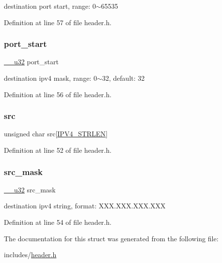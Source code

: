 destination port start, range\+: 0$\sim$65535 

Definition at line 57 of file header.\+h.

\mbox{\label{struct_input_arguments_a5465bae0b80139c3aab02aadda37a2ec}} 
\subsubsection{\texorpdfstring{port\+\_\+start}{port\_start}}
{\footnotesize\ttfamily \hyperlink{asm__types_8h_a3acae9310e2c2e411e800a8a369171c6}{\+\_\+\+\_\+u32} port\+\_\+start}

destination ipv4 mask, range\+: 0$\sim$32, default\+: 32 

Definition at line 56 of file header.\+h.

\mbox{\label{struct_input_arguments_a70b9300e7d151f7aadcba8a1c81f3fd9}} 
\subsubsection{\texorpdfstring{src}{src}}
{\footnotesize\ttfamily unsigned char src\mbox{[}\hyperlink{header_8h_ad5057f0ae40bc5ff36e7c9e65ea6c457}{I\+P\+V4\+\_\+\+S\+T\+R\+L\+EN}\mbox{]}}



Definition at line 52 of file header.\+h.

\mbox{\label{struct_input_arguments_a4fc0f7b36bc43c7590cb0843282368aa}} 
\subsubsection{\texorpdfstring{src\+\_\+mask}{src\_mask}}
{\footnotesize\ttfamily \hyperlink{asm__types_8h_a3acae9310e2c2e411e800a8a369171c6}{\+\_\+\+\_\+u32} src\+\_\+mask}

destination ipv4 string, format\+: X\+X\+X.\+X\+X\+X.\+X\+X\+X.\+X\+XX 

Definition at line 54 of file header.\+h.



The documentation for this struct was generated from the following file\+:\begin{DoxyCompactItemize}
\item 
includes/\hyperlink{header_8h}{header.\+h}\end{DoxyCompactItemize}
